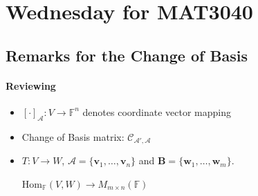 
\section{Wednesday for MAT3040}
\subsection{Remarks for the Change of Basis}
\paragraph{Reviewing}
\begin{itemize}
\item
$[\cdot]_{\mathcal{A}}:V\to\mathbb{F}^n$ denotes coordinate vector mapping
\item
Change of Basis matrix: $\mathcal{C}_{\mathcal{A}',\mathcal{A}}$
\item
$T:V\to W$, $\mathcal{A}=\{\bm v_1,\dots,\bm v_n\}$ and $\bm B=\{\bm w_1,\dots,\bm w_m\}$.

$\text{Hom}_{\mathbb{F}}(V,W)\to M_{m\times n}(\mathbb{F})$
\end{itemize}

